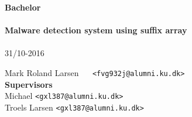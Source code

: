 \documentclass[a4paper,oneside]{memoir}
\begin{document}
    \thispagestyle{empty}
    \begin{adjustwidth}{-3cm}{-1.5cm}
    \vspace*{1cm}
    \textbf{\Huge Bachelor} \\
    \vspace*{2.5cm} \\
    \textbf{\Huge Malware detection system using suffix array} \\
    \vspace*{.1cm} \\
    {\huge 31/10-2016} \\
    \begin{tabbing}
    Mark Roland Larsen ~~ \= \texttt{<fvg932j@alumni.ku.dk>} 
    \\[12.1cm]
    \textbf{\Large Supervisors} \\
    Michael\> \texttt{<gxl387@alumni.ku.dk>} \\
    Troels Larsen\> \texttt{<gxl387@alumni.ku.dk>} \\
    \end{tabbing}
    \end{adjustwidth}
    \ClearWallPaper
\end{document}
